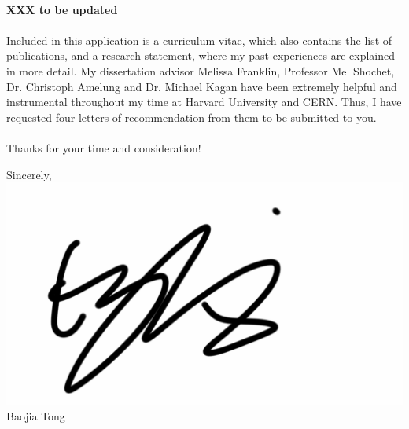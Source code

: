 \documentclass[letterpaper,11pt,oneside]{article}
\begin{document}
\paragraph{}
\textbf{XXX to be updated }

\paragraph{}
Included in this application is a curriculum vitae, which also contains the list of publications, and a research statement, where my past experiences are explained in more detail. My dissertation advisor Melissa Franklin, Professor Mel Shochet, Dr. Christoph Amelung and Dr. Michael Kagan have been extremely helpful and instrumental throughout my time at Harvard University and CERN. Thus, I have requested four letters of recommendation from them to be submitted to you.

\paragraph{}
Thanks for your time and consideration!

\begin{flushright}
Sincerely, \\
\vspace{1em} 
\includegraphics[scale=0.1]{Signature} \\ %
\vspace{1em} 
Baojia Tong \\
\end{flushright}
\end{document}
